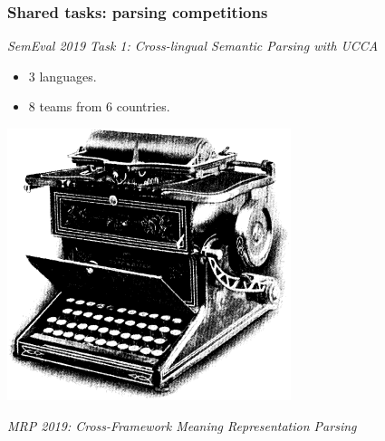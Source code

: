 \documentclass[t,xcolor={svgnames,table}]{beamer}
\begin{document}
\begin{frame}
\frametitle{Shared tasks: parsing competitions}
\textit{SemEval 2019 Task 1: Cross-lingual Semantic Parsing with UCCA}

\begin{minipage}{.6\textwidth}
\begin{itemize}
\item 3 languages.
\item 8 teams from 6 countries.
\end{itemize}
\end{minipage}
\hfill
\begin{minipage}{.1\textwidth}
\includegraphics[width=\textwidth]{type_writer2.png}
\end{minipage}

\pause
\vfill

\textit{MRP 2019: Cross-Framework Meaning Representation Parsing}


\end{frame}
\end{document}
